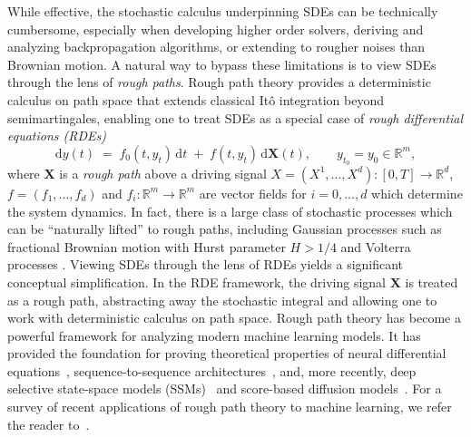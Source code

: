 \documentclass{article}
\theoremstyle{definition}
\theoremstyle{remark}
\begin{document}
While effective, the stochastic calculus underpinning SDEs can be technically cumbersome, especially when developing higher order solvers, deriving and analyzing backpropagation algorithms, or extending to rougher noises than Brownian motion. A natural way to bypass these limitations is to view SDEs through the lens of \emph{rough paths}. Rough path theory \citep{lyons1998differential, gubinelli2004controlling, gubinelli2010ramification} provides a deterministic calculus on path space that extends classical It\^o integration beyond semimartingales, enabling one to treat SDEs as a special case of \emph{rough differential equations (RDEs)}
\begin{equation}\label{eqn:rde}
\mathrm{d}y(t) \;=\; f_0(t, y_t)\,\mathrm{d}t \;+\; f(t, y_t)\,\mathrm{d}\mathbf{X}(t), 
\qquad y_{t_0} = y_0 \in \mathbb{R}^m, \tag{RDE}
\end{equation}
where $\mathbf{X}$ is a \emph{rough path} above a driving signal $X = (X^1,...,X^d) : [0,T] \to \mathbb{R}^d$, $f = (f_1,...,f_d)$ and $f_i : \mathbb{R}^m \to \mathbb{R}^m$ are  vector fields for $i=0,...,d$ which determine the system dynamics. In fact, there is a large class of stochastic processes which can be “naturally lifted” to rough paths, including Gaussian processes such as fractional Brownian motion with Hurst parameter $H > 1/4$ and Volterra processes \citep{friz2010multidimensional}. Viewing SDEs through the lens of RDEs yields a significant conceptual simplification. In the RDE framework, the driving signal $\mathbf{X}$ is treated as a rough path, abstracting away the stochastic integral and allowing one to work with deterministic calculus on path space. Rough path theory has become a powerful framework for analyzing modern machine learning models. It has provided the foundation for proving theoretical properties of neural differential equations~\citep{morrill2021neural, arribas2020sigsdes, cirone2023neural, holberg2024exact}, sequence-to-sequence architectures~\citep{kidger2019deep}, and, more recently, deep selective state-space models (SSMs)~\citep{cirone2024theoretical, cirone2025parallelflow, walker2025structured} and score-based diffusion models~\citep{barancikovasigdiffusions}. For a survey of recent applications of rough path theory to machine learning, we refer the reader to~\citep{fermanian2023new}.
\end{document}
